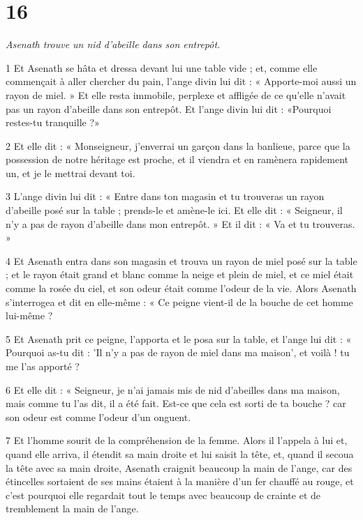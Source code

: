 \chapter{16}

\par \textit{Asenath trouve un nid d'abeille dans son entrepôt.}

\par 1 Et Asenath se hâta et dressa devant lui une table vide ; et, comme elle commençait à aller chercher du pain, l'ange divin lui dit : « Apporte-moi aussi un rayon de miel. » Et elle resta immobile, perplexe et affligée de ce qu'elle n'avait pas un rayon d'abeille dans son entrepôt. Et l'ange divin lui dit : «Pourquoi restes-tu tranquille ?»

\par 2 Et elle dit : « Monseigneur, j'enverrai un garçon dans la banlieue, parce que la possession de notre héritage est proche, et il viendra et en ramènera rapidement un, et je le mettrai devant toi.

\par 3 L'ange divin lui dit : « Entre dans ton magasin et tu trouveras un rayon d'abeille posé sur la table ; prends-le et amène-le ici. Et elle dit : « Seigneur, il n’y a pas de rayon d’abeille dans mon entrepôt. » Et il dit : « Va et tu trouveras. »

\par 4 Et Asenath entra dans son magasin et trouva un rayon de miel posé sur la table ; et le rayon était grand et blanc comme la neige et plein de miel, et ce miel était comme la rosée du ciel, et son odeur était comme l'odeur de la vie. Alors Asenath s'interrogea et dit en elle-même : « Ce peigne vient-il de la bouche de cet homme lui-même ?

\par 5 Et Asenath prit ce peigne, l'apporta et le posa sur la table, et l'ange lui dit : « Pourquoi as-tu dit : 'Il n'y a pas de rayon de miel dans ma maison', et voilà ! tu me l'as apporté ?

\par 6 Et elle dit : « Seigneur, je n'ai jamais mis de nid d'abeilles dans ma maison, mais comme tu l'as dit, il a été fait. Est-ce que cela est sorti de ta bouche ? car son odeur est comme l’odeur d’un onguent.

\par 7 Et l'homme sourit de la compréhension de la femme. Alors il l'appela à lui et, quand elle arriva, il étendit sa main droite et lui saisit la tête, et, quand il secoua la tête avec sa main droite, Asenath craignit beaucoup la main de l'ange, car des étincelles sortaient de ses mains étaient à la manière d'un fer chauffé au rouge, et c'est pourquoi elle regardait tout le temps avec beaucoup de crainte et de tremblement la main de l'ange.

